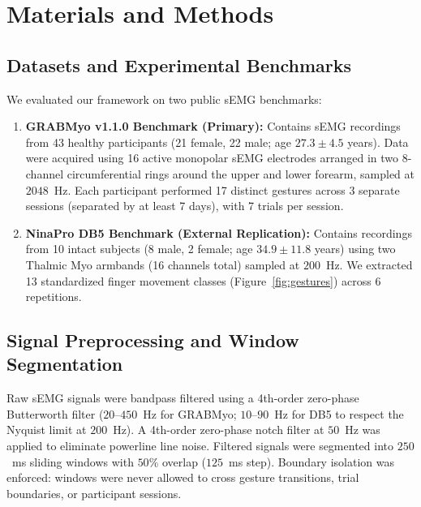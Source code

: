 \documentclass[final,5p,times,twocolumn]{elsarticle}
\begin{document}
\section{Materials and Methods}

\subsection{Datasets and Experimental Benchmarks}
We evaluated our framework on two public sEMG benchmarks:
\begin{enumerate}
    \item \textbf{GRABMyo v1.1.0 Benchmark (Primary):} Contains sEMG recordings from 43 healthy participants (21 female, 22 male; age $27.3 \pm 4.5$ years). Data were acquired using 16 active monopolar sEMG electrodes arranged in two 8-channel circumferential rings around the upper and lower forearm, sampled at $2048$~Hz. Each participant performed 17 distinct gestures across 3 separate sessions (separated by at least 7 days), with 7 trials per session.
    \item \textbf{NinaPro DB5 Benchmark (External Replication):} Contains recordings from 10 intact subjects (8 male, 2 female; age $34.9 \pm 11.8$ years) using two Thalmic Myo armbands (16 channels total) sampled at $200$~Hz. We extracted 13 standardized finger movement classes (Figure~\ref{fig:gestures}) across 6 repetitions.
\end{enumerate}

\subsection{Signal Preprocessing and Window Segmentation}
Raw sEMG signals were bandpass filtered using a 4th-order zero-phase Butterworth filter ($20$--$450$~Hz for GRABMyo; $10$--$90$~Hz for DB5 to respect the Nyquist limit at $200$~Hz). A 4th-order zero-phase notch filter at $50$~Hz was applied to eliminate powerline line noise. Filtered signals were segmented into $250$~ms sliding windows with $50\%$ overlap ($125$~ms step). Boundary isolation was enforced: windows were never allowed to cross gesture transitions, trial boundaries, or participant sessions.
\end{document}
